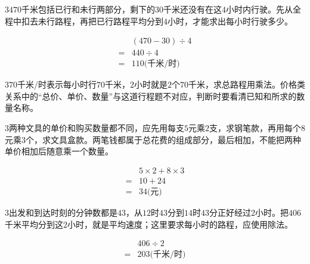 \documentclass[multi=snippet,border={5bp 20bp 5bp 5bp}]{standalone}
\newenvironment{snippet}[3]{\begin{minipage}{#1bp}\color{answerred}\fontsize{#2}{#3}\selectfont\raggedright}{\end{minipage}}
\begin{document}
\begin{snippet}{505}{11.5}{14}\begin{multicols}{3}\raggedcolumns \(470\)\allowbreak 千米包括已行和未行两部分，剩下的\(30\)\allowbreak 千米还没有在这\(4\)\allowbreak 小时内行驶。先从全程中扣去未行路程，再把已行路程平均分到\(4\)\allowbreak 小时，才能求出每小时行驶多少。\par \[\begin{aligned}&(470-30)\div4\\={}&440\div4\\={}&110\text{(千米/时)}\end{aligned}\]\end{multicols}\end{snippet}
\begin{snippet}{505}{11.5}{14}\begin{multicols}{3}\raggedcolumns \(70\)\allowbreak 千米/时表示每小时行\(70\)\allowbreak 千米，\(2\)\allowbreak 小时就是\(2\)\allowbreak 个\(70\)\allowbreak 千米，求总路程用乘法。价格类关系中的“总价、单价、数量”与这道行程题不对应，判断时要看清已知和所求的数量名称。\end{multicols}\end{snippet}
\begin{snippet}{505}{11.5}{14}\begin{multicols}{3}\raggedcolumns 两种文具的单价和购买数量都不同，应先用每支\(5\)\allowbreak 元乘\(2\)\allowbreak 支，求钢笔款，再用每个\(8\)\allowbreak 元乘\(3\)\allowbreak 个，求文具盒款。两笔钱都属于总花费的组成部分，最后相加，不能把两种单价相加后随意乘一个数量。\par \[\begin{aligned}&5\times2+8\times3\\={}&10+24\\={}&34\text{(元)}\end{aligned}\]\end{multicols}\end{snippet}
\begin{snippet}{505}{11.5}{14}\begin{multicols}{3}\raggedcolumns 出发和到达时刻的分钟数都是\(43\)\allowbreak ，从\(12\)\allowbreak 时\(43\)\allowbreak 分到\(14\)\allowbreak 时\(43\)\allowbreak 分正好经过\(2\)\allowbreak 小时。把\(406\)\allowbreak 千米平均分到这\(2\)\allowbreak 小时，就是平均速度；这里要求每小时的路程，应使用除法。\par \[\begin{aligned}&406\div2\\={}&203\text{(千米/时)}\end{aligned}\]\end{multicols}\end{snippet}
\end{document}
